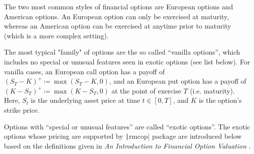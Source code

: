 The two most common styles of financial options are European options and American options. An European option can only be exercised at maturity, whereas an American option can be exercised at anytime prior to maturity (which is a more complex setting).

The most typical "family" of options are the so called ``vanilla options'', which includes no special or unusual features seen in exotic options (see list below). For vanilla cases, an European call option has a payoff of $(S_T-K)^+ \coloneqq \max{(S_T-K,0)}$, and an European put option has a payoff of $(K-S_T)^+ \coloneqq \max{(K-S_T,0)}$ \cite{Glasserman2003} at the point of exercise $T$ (i.e. maturity). Here, $S_t$ is the underlying asset price at time $t\in[0,T]$, and $K$ is the option's strike price.

Options with ``special or unusual features'' are called ``exotic options''. The exotic options whose pricing are supported by \texttt|rmcop| package are introduced below based on the definitions given in \textit{An Introduction to Financial Option Valuation} \cite{Higham2004}.


